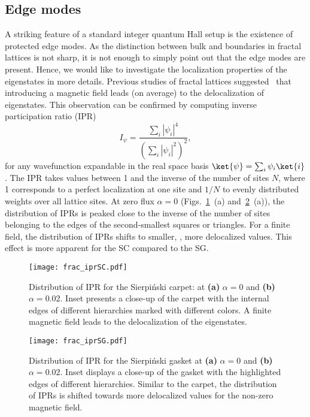 \subsection{Edge modes}
\label{sec:frac_edgemodes}
A striking feature of a standard integer quantum Hall setup is the existence of protected edge modes. As the distinction between bulk and boundaries in fractal lattices is not sharp, it is not enough to simply point out that the edge modes are present. Hence, we would like to investigate the localization properties of the eigenstates in more details. Previous studies of fractal lattices suggested~\cite{supp1, supp2} that introducing a magnetic field leads (on average) to the delocalization of eigenstates. This observation can be confirmed by computing inverse participation ratio (IPR)
\begin{equation}
I_{\psi} = \frac{\sum_i | \psi_i |^4}{\left(\sum_i  |\psi_i |^2 \right)^2}, 
\label{eq:ipr}
\end{equation}
for any wavefunction expandable in the real space basis $\ket{\psi} = \sum_i \psi_i \ket{i}$. The IPR takes values between 1 and the inverse of the number of sites $N$, where 1 corresponds to a perfect localization at one site and $1/N$ to evenly distributed weights over all lattice sites. At zero flux $\alpha = 0$ (Figs.~\ref{fig:IPR_SC}~(a) and~\ref{fig:IPR_SG}~(a)), the distribution of IPRs is peaked close to the inverse of the number of sites belonging to the edges of the second-smallest squares or triangles. For a finite field, the distribution of IPRs shifts to smaller, \ie, more delocalized values. This effect is more apparent for the SC compared to the SG.

\begin{figure}[H]
\centering
\texttt{[image: frac\_iprSC.pdf]}
\caption[Distribution of IPR for the Sierpiński carpet]{Distribution of IPR for the Sierpiński carpet: at \textbf{(a)} $\alpha = 0$ and \textbf{(b)} $\alpha = 0.02$. Inset presents a close-up of the carpet with the internal edges of different hierarchies marked with different colors. A finite magnetic field leads to the delocalization of the eigenstates.}
\label{fig:IPR_SC}
\end{figure}

\begin{figure}[H]
\centering
\texttt{[image: frac\_iprSG.pdf]}
\caption[Distribution of IPR for the Sierpiński gasket]{Distribution of IPR for the Sierpiński gasket at \textbf{(a)} $\alpha = 0$ and \textbf{(b)} $\alpha = 0.02$. Inset displays a close-up of the gasket with the highlighted edges of different hierarchies. Similar to the carpet, the distribution of IPRs is shifted towards more delocalized values for the non-zero magnetic field.}
\label{fig:IPR_SG}
\end{figure}

